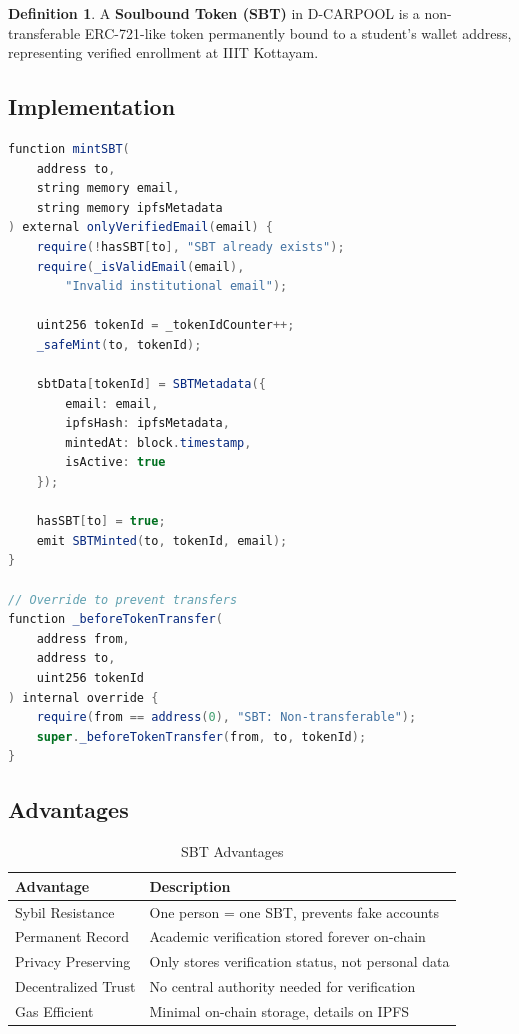 \documentclass[12pt]{report}
\theoremstyle{plain}
\theoremstyle{definition}
\newtheorem{definition}[theorem]{Definition}
\theoremstyle{remark}
\begin{document}
\begin{definition}
A \textbf{Soulbound Token (SBT)} in D-CARPOOL is a non-transferable ERC-721-like token permanently bound to a student's wallet address, representing verified enrollment at IIIT Kottayam.
\end{definition}

\subsection{Implementation}

\begin{lstlisting}[language=Java, caption=SBT Minting Function]
function mintSBT(
    address to,
    string memory email,
    string memory ipfsMetadata
) external onlyVerifiedEmail(email) {
    require(!hasSBT[to], "SBT already exists");
    require(_isValidEmail(email), 
        "Invalid institutional email");
    
    uint256 tokenId = _tokenIdCounter++;
    _safeMint(to, tokenId);
    
    sbtData[tokenId] = SBTMetadata({
        email: email,
        ipfsHash: ipfsMetadata,
        mintedAt: block.timestamp,
        isActive: true
    });
    
    hasSBT[to] = true;
    emit SBTMinted(to, tokenId, email);
}

// Override to prevent transfers
function _beforeTokenTransfer(
    address from,
    address to,
    uint256 tokenId
) internal override {
    require(from == address(0), "SBT: Non-transferable");
    super._beforeTokenTransfer(from, to, tokenId);
}
\end{lstlisting}

\subsection{Advantages}

\begin{table}[H]
\centering
\caption{SBT Advantages}
\begin{tabular}{|l|p{8cm}|}
\hline
\textbf{Advantage} & \textbf{Description} \\
\hline
Sybil Resistance & One person = one SBT, prevents fake accounts \\
Permanent Record & Academic verification stored forever on-chain \\
Privacy Preserving & Only stores verification status, not personal data \\
Decentralized Trust & No central authority needed for verification \\
Gas Efficient & Minimal on-chain storage, details on IPFS \\
\hline
\end{tabular}
\end{table}
\end{document}

